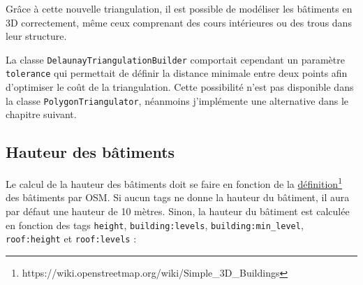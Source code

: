 Grâce à cette nouvelle triangulation, il est possible de modéliser les bâtiments en 3D correctement, même ceux comprenant des cours intérieures ou des trous dans leur structure.

La classe \texttt{DelaunayTriangulationBuilder} comportait cependant un paramètre \texttt{tolerance} qui permettait de définir la distance minimale entre deux points afin d'optimiser le coût de la triangulation. Cette possibilité n'est pas disponible dans la classe \texttt{PolygonTriangulator}, néanmoins j'implémente une alternative dans le chapitre suivant.

\subsection{Hauteur des bâtiments}

Le calcul de la hauteur des bâtiments doit se faire en fonction de la \href{https://wiki.openstreetmap.org/wiki/Simple_3D_Buildings}{définition}\footnote{https://wiki.openstreetmap.org/wiki/Simple\_3D\_Buildings} des bâtiments par OSM. Si aucun tags ne donne la hauteur du bâtiment, il aura par défaut une hauteur de 10 mètres. Sinon, la hauteur du bâtiment est calculée en fonction des tags \texttt{height}, \texttt{building:levels}, \texttt{building:min\_level}, \texttt{roof:height} et \texttt{roof:levels} :

